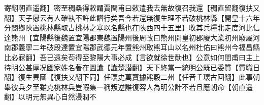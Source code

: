 寄翻朝直遥翻】密至稠桑得敕謂賈閏甫曰敕遣我去無故復召我還【稠直留翻復扶又翻】天子曏云有人確執不許此譖行矣吾今若還無復生理不若破桃林縣【開皇十六年分閿鄉陜置桃林縣取古桃林之塞以名縣也在陜西四十五里】收其兵糧北走度河比信達熊州【宜陽縣後魏置宜陽郡東魏置陽州後周改曰熊州開皇初郡廢大業初州廢屬河南郡義寧二年破段達置宜陽郡武德元年置熊州取熊耳山以名州杜佑曰熊州今福昌縣比必寐翻】吾已遠矣苟得至黎陽大事必成【言欲就徐世勣也】公意如何閏甫曰主上待明公甚厚况國家姓名著在圖䜟【䜟楚譛翻】天下終當一統明公既已委質【質職日翻】復生異圖【復扶又翻下同】任瓌史萬寶據熊穀二州【任音壬瓌古回翻】此事朝舉彼兵夕至雖克桃林兵豈暇集一稱叛逆誰復容人為明公計不若且應朝命【朝直遥翻】以明元無異心自然浸潤不